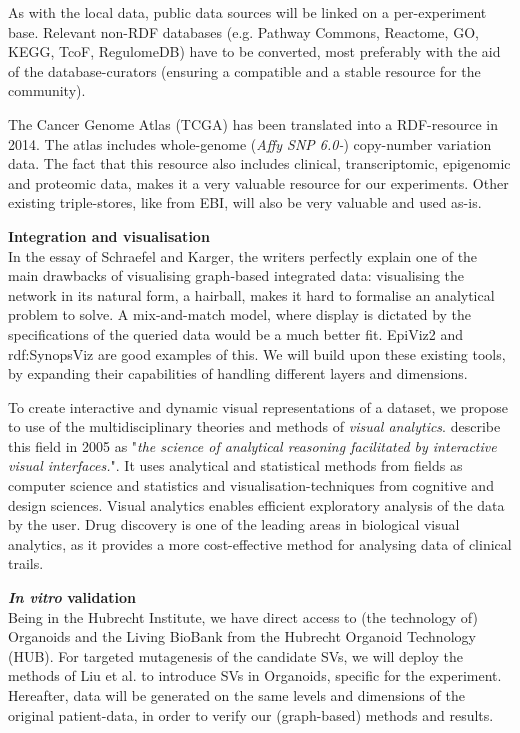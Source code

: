 \documentclass[twoside,fontsize=12pt]{article}
\begin{document}
As with the local data, public data sources will be linked on a per-experiment base. Relevant non-RDF databases (e.g. Pathway Commons\cite{Cerami2011}, Reactome\cite{Jupp2014}, GO\cite{Ashburner2000}, KEGG\cite{Kanehisa2000}, TcoF\cite{Schaefer2011}, RegulomeDB\cite{Boyle2012}) have to be converted, most preferably with the aid of the database-curators (ensuring a compatible and a stable resource for the community). 

The Cancer Genome Atlas (TCGA) has been translated into a RDF-resource in 2014\cite{Saleem2014}. The atlas includes whole-genome (\emph{Affy SNP 6.0-}) copy-number variation data. The fact that this resource also includes clinical, transcriptomic, epigenomic and proteomic data, makes it a very valuable resource for our experiments. Other existing triple-stores, like from EBI\cite{Jupp2014}, will also be very valuable and used as-is.
\medskip

\noindent
\textbf{Integration and visualisation} \\
In the essay of Schraefel and Karger\citep{Schraefel2006}, the writers perfectly explain one of the main drawbacks of visualising graph-based integrated data: visualising the network in its natural form, a hairball, makes it hard to formalise an analytical problem to solve. A mix-and-match model, where display is dictated by the specifications of the queried data would be a much better fit. EpiViz2\cite{Chelaru2014} and rdf:SynopsViz\cite{Athens2013} are good examples of this. We will build upon these existing tools, by expanding their capabilities of handling different layers and dimensions.

To create interactive and dynamic visual representations of a dataset, we propose to use of the multidisciplinary theories and methods of \textit{visual analytics}. \citet{Thomas2005} describe this field in 2005 as "\textit{the science of analytical reasoning facilitated by interactive visual interfaces.}". It uses analytical and statistical methods from fields as computer science and statistics and visualisation-techniques from cognitive and design sciences. Visual analytics enables efficient exploratory analysis of the data by the user. Drug discovery is one of the leading areas in biological visual analytics, as it provides a more cost-effective method for analysing data of clinical trails\cite{Cao2008}.
\medskip

\noindent
\textbf{\textit{In vitro} validation} \\
Being in the Hubrecht Institute, we have direct access to (the technology of) Organoids and the Living BioBank from the Hubrecht Organoid Technology (HUB). For targeted mutagenesis of the candidate SVs, we will deploy the methods of Liu et al.\cite{Liu2014a} to introduce SVs in Organoids, specific for the experiment. Hereafter, data will be generated on the same levels and dimensions of the original patient-data, in order to verify our (graph-based) methods and results.
\end{document}
